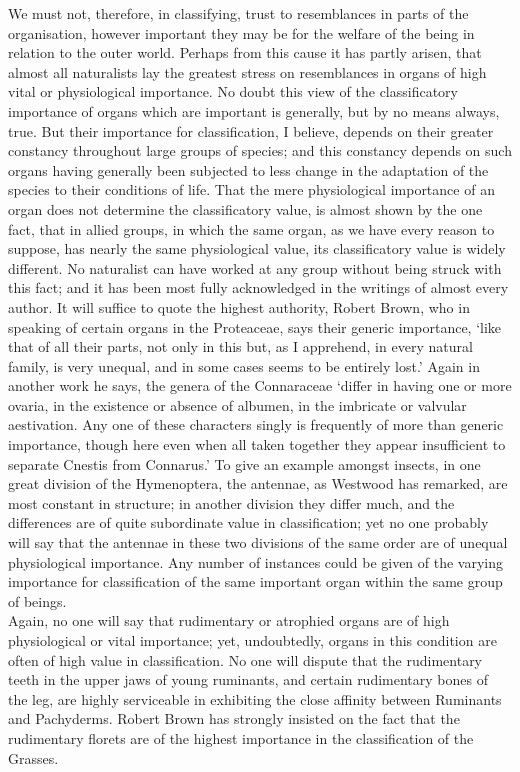 \indent We must not, therefore, in classifying, trust to resemblances in parts of the organisation, however important they may be for the welfare of the being in relation to the outer world. Perhaps from this cause it has partly arisen, that almost all naturalists lay the greatest stress on resemblances in organs of high vital or physiological importance. No doubt this view of the classificatory importance of organs which are important is generally, but by no means always, true. But their importance for classification, I believe, depends on their greater constancy throughout large groups of species; and this constancy depends on such organs having generally been subjected to less change in the adaptation of the species to their conditions of life. That the mere physiological importance of an organ does not determine the classificatory value, is almost shown by the one fact, that in allied groups, in which the same organ, as we have every reason to suppose, has nearly the same physiological value, its classificatory value is widely different. No naturalist can have worked at any group without being struck with this fact; and it has been most fully acknowledged in the writings of almost every author. It will suffice to quote the highest authority, Robert Brown, who in speaking of certain organs in the Proteaceae, says their generic importance, `like that of all their parts, not only in this but, as I apprehend, in every natural family, is very unequal, and in some cases seems to be entirely lost.' Again in another work he says, the genera of the Connaraceae `differ in having one or more ovaria, in the existence or absence of albumen, in the imbricate or valvular aestivation. Any one of these characters singly is frequently of more than generic importance, though here even when all taken together they appear insufficient to separate Cnestis from Connarus.' To give an example amongst insects, in one great division of the Hymenoptera, the antennae, as Westwood has remarked, are most constant in structure; in another division they differ much, and the differences are of quite subordinate value in classification; yet no one probably will say that the antennae in these two divisions of the same order are of unequal physiological importance. Any number of instances could be given of the varying importance for classification of the same important organ within the same group of beings.~\\
\indent Again, no one will say that rudimentary or atrophied organs are of high physiological or vital importance; yet, undoubtedly, organs in this condition are often of high value in classification. No one will dispute that the rudimentary teeth in the upper jaws of young ruminants, and certain rudimentary bones of the leg, are highly serviceable in exhibiting the close affinity between Ruminants and Pachyderms. Robert Brown has strongly insisted on the fact that the rudimentary florets are of the highest importance in the classification of the Grasses.~\\

